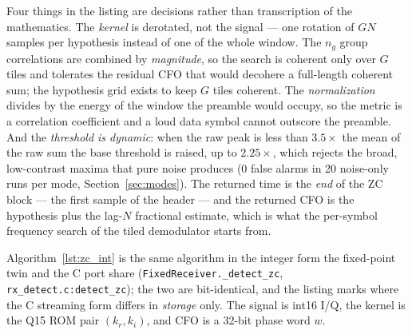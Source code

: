 Four things in the listing are decisions rather than transcription of
the mathematics.  The \emph{kernel} is derotated, not the signal ---
one rotation of $GN$ samples per hypothesis instead of one of the
whole window.  The $n_g$ group correlations are combined by
\emph{magnitude}, so the search is coherent only over $G$ tiles and
tolerates the residual CFO that would decohere a full-length
coherent sum; the hypothesis grid exists to keep $G$ tiles coherent.
The \emph{normalization} divides by the energy of the window the
preamble would occupy, so the metric is a correlation coefficient
and a loud data symbol cannot outscore the preamble.  And the
\emph{threshold is dynamic}: when the raw peak is less than $3.5\times$
the mean of the raw sum the base threshold is raised, up to
$2.25\times$, which rejects the broad, low-contrast maxima that pure
noise produces (0 false alarms in 20 noise-only runs per mode,
Section~\ref{sec:modes}).  The returned time is the \emph{end} of the
ZC block --- the first sample of the header --- and the returned CFO is
the hypothesis plus the lag-$N$ fractional estimate, which is what the
per-symbol frequency search of the tiled demodulator starts from.

Algorithm~\ref{lst:zc_int} is the same algorithm in the integer form the
fixed-point twin and the C port share (\texttt{FixedReceiver.\_detect\_zc},
\texttt{rx\_detect.c:detect\_zc}); the two are bit-identical, and the
listing marks where the C streaming form differs in \emph{storage}
only.  The signal is int16 I/Q, the kernel is the Q15 ROM pair
$(k_r, k_i)$, and CFO is a 32-bit phase word $w$.

